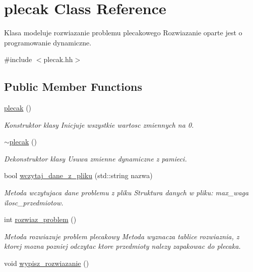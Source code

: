\hypertarget{classplecak}{\section{plecak Class Reference}
\label{classplecak}
}


Klasa modeluje rozwiazanie problemu plecakowego Rozwiazanie oparte jest o programowanie dynamiczne.  




{\ttfamily \#include $<$plecak.\-hh$>$}

\subsection*{Public Member Functions}
\begin{DoxyCompactItemize}
\item 
\hyperlink{classplecak_ae4a83a03f80233a82ca1d2d1f963432a}{plecak} ()
\begin{DoxyCompactList}\small\item\em Konstruktor klasy Inicjuje wszystkie wartosc zmiennych na 0. \end{DoxyCompactList}\item 
\hypertarget{classplecak_a918a266d6f8e95439b6ba37c1f6b41cf}{\hyperlink{classplecak_a918a266d6f8e95439b6ba37c1f6b41cf}{$\sim$plecak} ()}\label{classplecak_a918a266d6f8e95439b6ba37c1f6b41cf}

\begin{DoxyCompactList}\small\item\em Dekonstruktor klasy Usuwa zmienne dynamiczne z pamieci. \end{DoxyCompactList}\item 
bool \hyperlink{classplecak_ae4b5878061c14a86371e36b3e7709aef}{wczytaj\-\_\-dane\-\_\-z\-\_\-pliku} (std\-::string nazwa)
\begin{DoxyCompactList}\small\item\em Metoda wczytujaca dane problemu z pliku Struktura danych w pliku\-: max\-\_\-waga ilosc\-\_\-przedmiotow. \end{DoxyCompactList}\item 
int \hyperlink{classplecak_a9fa70bc46cdb1e4bcb61ceca790f1c23}{rozwiaz\-\_\-problem} ()
\begin{DoxyCompactList}\small\item\em Metoda rozwiazuje problem plecakowy Metoda wyznacza tablice rozwiaznia, z ktorej mozna pozniej odczytac ktore przedmioty nalezy zapakowac do plecaka. \end{DoxyCompactList}\item 
\hypertarget{classplecak_ac396f4e6354e7dd63e5145e65aefef35}{void \hyperlink{classplecak_ac396f4e6354e7dd63e5145e65aefef35}{wypisz\-\_\-rozwiazanie} ()}\label{classplecak_ac396f4e6354e7dd63e5145e65aefef35}


\end{DoxyCompactItemize}
